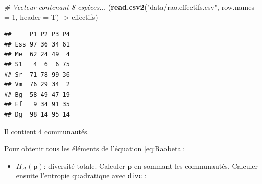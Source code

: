 \documentclass[
  11pt,
  french,
  a4paper,
  extrafontsizes,onecolumn,openright
  ]{memoir}
\newenvironment{Shaded}{\begin{snugshade}}{\end{snugshade}}
\newcommand{\CommentTok}[1]{\textcolor[rgb]{0.56,0.35,0.01}{\textit{#1}}}
\newcommand{\DataTypeTok}[1]{\textcolor[rgb]{0.13,0.29,0.53}{#1}}
\newcommand{\DecValTok}[1]{\textcolor[rgb]{0.00,0.00,0.81}{#1}}
\newcommand{\KeywordTok}[1]{\textcolor[rgb]{0.13,0.29,0.53}{\textbf{#1}}}
\newcommand{\NormalTok}[1]{#1}
\newcommand{\OperatorTok}[1]{\textcolor[rgb]{0.81,0.36,0.00}{\textbf{#1}}}
\newcommand{\OtherTok}[1]{\textcolor[rgb]{0.56,0.35,0.01}{#1}}
\newcommand{\StringTok}[1]{\textcolor[rgb]{0.31,0.60,0.02}{#1}}
\providecommand{\tightlist}{%
  \setlength{\itemsep}{0pt}\setlength{\parskip}{0pt}}
\begin{document}
\scriptsize

\begin{Shaded}
\begin{Highlighting}[]
\CommentTok{# Vecteur contenant 8 espèces...}
\NormalTok{(}\KeywordTok{read.csv2}\NormalTok{(}\StringTok{"data/rao.effectifs.csv"}\NormalTok{, }\DataTypeTok{row.names =} \DecValTok{1}\NormalTok{, }\DataTypeTok{header =}\NormalTok{ T) ->}
\StringTok{    }\NormalTok{effectifs)}
\end{Highlighting}
\end{Shaded}

\begin{verbatim}
##     P1 P2 P3 P4
## Ess 97 36 34 61
## Me  62 24 49  4
## S1   4  6  6 75
## Sr  71 78 99 36
## Vm  76 29 34  2
## Bg  58 49 47 19
## Ef   9 34 91 35
## Dg  98 14 95 14
\end{verbatim}

\begin{Shaded}
\end{Shaded}

\normalsize

Il contient 4 communautés.

Pour obtenir tous les éléments de l'équation \eqref{eq:Raobeta}:

\begin{itemize}
\tightlist
\item
  \(H_{\Delta }\left(\mathbf{p}\right)\): diversité totale. Calculer \(\mathbf{p}\) en sommant les communautés. Calculer ensuite l'entropie quadratique avec \texttt{divc} :
\end{itemize}
\end{document}

